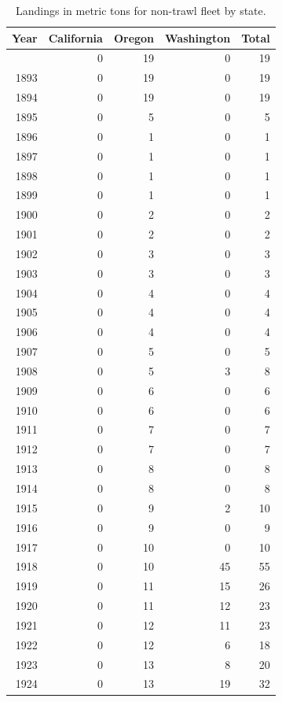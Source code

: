 \documentclass[
  english,
]{article}
\begin{document}
\begin{longtable}{rrrrr}

\caption{\label{tbl-NT_landings}Landings in metric tons for non-trawl
fleet by state.}

\tabularnewline

\toprule
Year & California & Oregon & Washington & Total \\ 
\midrule\addlinespace[2.5pt]
1892 & 0 & 19 & 0 & 19 \\ 
1893 & 0 & 19 & 0 & 19 \\ 
1894 & 0 & 19 & 0 & 19 \\ 
1895 & 0 & 5 & 0 & 5 \\ 
1896 & 0 & 1 & 0 & 1 \\ 
1897 & 0 & 1 & 0 & 1 \\ 
1898 & 0 & 1 & 0 & 1 \\ 
1899 & 0 & 1 & 0 & 1 \\ 
1900 & 0 & 2 & 0 & 2 \\ 
1901 & 0 & 2 & 0 & 2 \\ 
1902 & 0 & 3 & 0 & 3 \\ 
1903 & 0 & 3 & 0 & 3 \\ 
1904 & 0 & 4 & 0 & 4 \\ 
1905 & 0 & 4 & 0 & 4 \\ 
1906 & 0 & 4 & 0 & 4 \\ 
1907 & 0 & 5 & 0 & 5 \\ 
1908 & 0 & 5 & 3 & 8 \\ 
1909 & 0 & 6 & 0 & 6 \\ 
1910 & 0 & 6 & 0 & 6 \\ 
1911 & 0 & 7 & 0 & 7 \\ 
1912 & 0 & 7 & 0 & 7 \\ 
1913 & 0 & 8 & 0 & 8 \\ 
1914 & 0 & 8 & 0 & 8 \\ 
1915 & 0 & 9 & 2 & 10 \\ 
1916 & 0 & 9 & 0 & 9 \\ 
1917 & 0 & 10 & 0 & 10 \\ 
1918 & 0 & 10 & 45 & 55 \\ 
1919 & 0 & 11 & 15 & 26 \\ 
1920 & 0 & 11 & 12 & 23 \\ 
1921 & 0 & 12 & 11 & 23 \\ 
1922 & 0 & 12 & 6 & 18 \\ 
1923 & 0 & 13 & 8 & 20 \\ 
1924 & 0 & 13 & 19 & 32 \\ 

\end{longtable}
\end{document}
